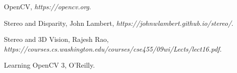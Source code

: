 \documentclass[magisterska]{pracadypl}
\begin{document}
\begin{thebibliography}{7}

OpenCV, 
\textit{https://opencv.org}.

Stereo and Disparity, John Lambert,  
\textit{https://johnwlambert.github.io/stereo/}.

Stereo and 3D Vision, Rajesh Rao, 
\textit{https://courses.cs.washington.edu/courses/cse455/09wi/Lects/lect16.pdf}.

Learning OpenCV 3, O'Reilly. 

\end{thebibliography}
\end{document}
